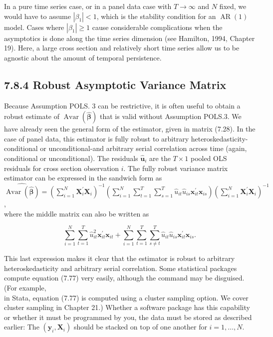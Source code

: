 \documentclass[10pt]{article}
\begin{document}
In a pure time series case, or in a panel data case with $T \rightarrow \infty$ and $N$ fixed, we would have to assume $\left|\beta_{1}\right|<1$, which is the stability condition for an $\operatorname{AR}(1)$ model. Cases where $\left|\beta_{1}\right| \geq 1$ cause considerable complications when the asymptotics is done along the time series dimension (see Hamilton, 1994, Chapter 19). Here, a large cross section and relatively short time series allow us to be agnostic about the amount of temporal persistence.

\subsection*{7.8.4 Robust Asymptotic Variance Matrix}
Because Assumption POLS. 3 can be restrictive, it is often useful to obtain a robust estimate of $\operatorname{Avar}(\hat{\boldsymbol{\beta}})$ that is valid without Assumption POLS.3. We have already seen the general form of the estimator, given in matrix (7.28). In the case of panel data, this estimator is fully robust to arbitrary heteroskedasticity-conditional or unconditional-and arbitrary serial correlation across time (again, conditional or unconditional). The residuals $\hat{\mathbf{u}}_{i}$ are the $T \times 1$ pooled OLS residuals for cross section observation $i$. The fully robust variance matrix estimator can be expressed in the sandwich form as\\
$\widehat{\operatorname{Avar}(\hat{\boldsymbol{\beta}})}=\left(\sum_{i=1}^{N} \mathbf{X}_{i}^{\prime} \mathbf{X}_{i}\right)^{-1}\left(\sum_{i=1}^{N} \sum_{t=1}^{T} \sum_{s=1}^{T} \hat{u}_{i t} \hat{u}_{i s} \mathbf{x}_{i t}^{\prime} \mathbf{x}_{i s}\right)\left(\sum_{i=1}^{N} \mathbf{X}_{i}^{\prime} \mathbf{X}_{i}\right)^{-1}$,\\
where the middle matrix can also be written as


\begin{equation*}
\sum_{i=1}^{N} \sum_{t=1}^{T} \hat{u}_{i t}^{2} \mathbf{x}_{i t}^{\prime} \mathbf{x}_{i t}+\sum_{i=1}^{N} \sum_{t=1}^{T} \sum_{s \neq t}^{T} \hat{u}_{i t} \hat{u}_{i s} \mathbf{x}_{i t}^{\prime} \mathbf{x}_{i s} . \tag{7.78}
\end{equation*}


This last expression makes it clear that the estimator is robust to arbitrary heteroskedasticity and arbitrary serial correlation. Some statistical packages compute equation (7.77) very easily, although the command may be disguised. (For example,\\
in Stata, equation (7.77) is computed using a cluster sampling option. We cover cluster sampling in Chapter 21.) Whether a software package has this capability or whether it must be programmed by you, the data must be stored as described earlier: The $\left(\mathbf{y}_{i}, \mathbf{X}_{i}\right)$ should be stacked on top of one another for $i=1, \ldots, N$.
\end{document}
